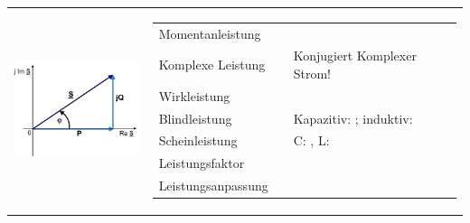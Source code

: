 	\begin{tabular}{ll}
   		\parbox{4cm}{
   			\includegraphics[width=4cm]{./bilder/zeigerdiag-leistungen.png}}
   		& \parbox{14cm}{
			\begin{tabular}{p{3cm}p{5cm}p{5.5cm}}
	      		Momentanleistung
	      			& $p(t) = u(t) i(t)$
	      			\\
				Komplexe Leistung 
					& $ \underline{S} = \underline{U} \cdot \underline{I}^\ast = U\cdot I \cdot
					e^{j(\varphi_u-\varphi_i)}$  & Konjugiert Komplexer Strom! \\
				Wirkleistung
					& $ P = \Real(\underline{S}) = U I \cos(\varphi) $ \\
				Blindleistung 
					& $ Q = \Imag(\underline{S}) = U I \sin(\varphi) $
					& Kapazitiv: $Q < 0$; induktiv: $Q > 0$ \\
				Scheinleistung
					& $ S = | \underline{S} | = U I = \frac{U^2}{R} = I^2 R$ 
					& C: $Q_c=-\omega CU_C^2$, L: $Q_L=\omega LI_L^2$\\
				Leistungsfaktor
					& $\cos \varphi = \frac{P}{S} = \frac{P}{UI}$ \\
				Leistungsanpassung
					& $\underline{Z}_L = \underline{Z}_i^{\ast}; \; P_{max} = \frac{U_q^2}{4
					R_i} = \frac{I_q^2 R_i}{4} $
			\end{tabular}}
   	\end{tabular}

